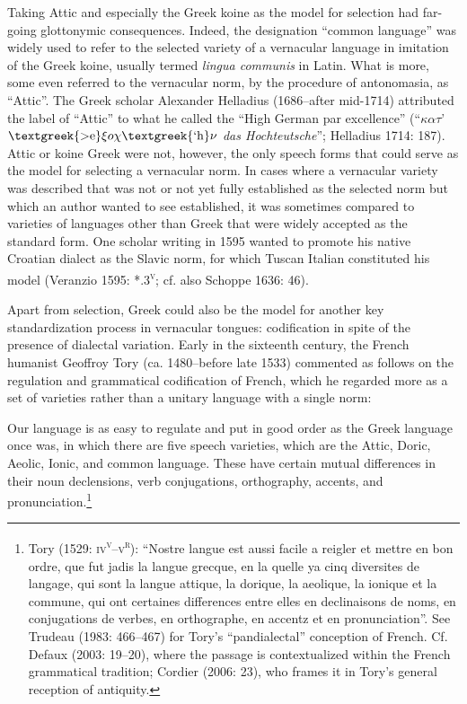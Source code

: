 \documentclass[12pt]{article}
\newenvironment{styleStandard}{\renewcommand\baselinestretch{1.25}\setlength\leftskip{0in}\setlength\rightskip{0in}\setlength\parindent{0.1972in}\setlength\parfillskip{0pt plus 1fil}\setlength\parskip{0in plus 1pt}\writerlistparindent\writerlistleftskip\leavevmode\normalfont\normalsize\writerlistlabel\ignorespaces}{\unskip\vspace{0in plus 1pt}\par}
\newenvironment{styleQuote}{\renewcommand\baselinestretch{1.25}\setlength\leftskip{0.3937in}\setlength\rightskip{0in}\setlength\parindent{0in}\setlength\parfillskip{0pt plus 1fil}\setlength\parskip{0.1665in plus 0.016649999in}\writerlistparindent\writerlistleftskip\leavevmode\normalfont\normalsize\writerlistlabel\ignorespaces}{\unskip\vspace{0.1665in plus 0.016649999in}\par}
\newcommand\writerlistleftskip{}
\newcommand\writerlistparindent{}
\newcommand\writerlistlabel{}
\begin{document}
\begin{styleStandard}
Taking Attic and especially the Greek koine as the model for selection had far-going glottonymic consequences. Indeed, the designation “common language” was widely used to refer to the selected variety of a vernacular language in imitation of the Greek koine, usually termed \textit{lingua communis} in Latin. What is more, some even referred to the vernacular norm, by the procedure of antonomasia, as “Attic”. The Greek scholar Alexander Helladius (1686–after mid-1714) attributed the label of “Attic” to what he called the “High German par excellence” (“$\kappa \alpha \tau $’ $\text{\textgreek{>e}}\xi o\chi \text{\textgreek{`h}}\nu $ \textit{das Hochteutsche}”; Helladius 1714: 187). Attic or koine Greek were not, however, the only speech forms that could serve as the model for selecting a vernacular norm. In cases where a vernacular variety was described that was not or not yet fully established as the selected norm but which an author wanted to see established, it was sometimes compared to varieties of languages other than Greek that were widely accepted as the standard form. One scholar writing in 1595 wanted to promote his native Croatian dialect as the Slavic norm, for which Tuscan Italian constituted his model (Veranzio 1595: *.3\textsc{\textsuperscript{v}}; cf. also Schoppe 1636: 46).
\end{styleStandard}

\begin{styleStandard}
Apart from selection, Greek could also be the model for another key standardization process in vernacular tongues: codification in spite of the presence of dialectal variation. Early in the sixteenth century, the French humanist Geoffroy Tory (ca. 1480–before late 1533) commented as follows on the regulation and grammatical codification of French, which he regarded more as a set of varieties rather than a unitary language with a single norm:
\end{styleStandard}

\begin{styleQuote}
Our language is as easy to regulate and put in good order as the Greek language once was, in which there are five speech varieties, which are the Attic, Doric, Aeolic, Ionic, and common language. These have certain mutual differences in their noun declensions, verb conjugations, orthography, accents, and pronunciation.\footnote{ Tory (1529: \textsc{iv}\textsc{\textsuperscript{v}}\textsc{–v}\textsc{\textsuperscript{r}}): “Nostre langue est aussi facile a reigler et mettre en bon ordre, que fut jadis la langue grecque, en la quelle ya cinq diversites de langage, qui sont la langue attique, la dorique, la aeolique, la ionique et la commune, qui ont certaines differences entre elles en declinaisons de noms, en conjugations de verbes, en orthographe, en accentz et en pronunciation”. See Trudeau (1983: 466–467) for Tory’s “pandialectal” conception of French. Cf. Defaux (2003: 19–20), where the passage is contextualized within the French grammatical tradition; Cordier (2006: 23), who frames it in Tory’s general reception of antiquity.}
\end{styleQuote}
\end{document}

